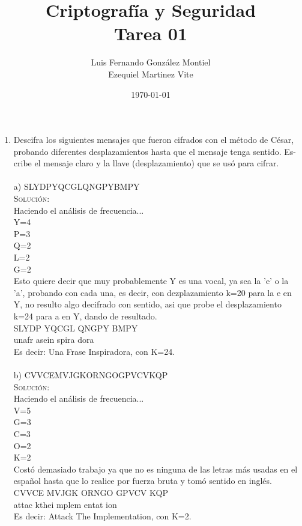 \documentclass[letterpaper,10pt]{article}
\title{Criptografía y Seguridad \\ Tarea 01}
\author{Luis Fernando González Montiel  \\
        Ezequiel Martinez Vite }
\date{\today}
\begin{document}
\maketitle

\begin{enumerate}
    \item Descifra los siguientes mensajes que fueron cifrados con el método de César, probando diferentes desplazamientos hasta que el mensaje tenga sentido. Es-
cribe el mensaje claro y la llave (desplazamiento) que se usó para cifrar.\\ \\
	a) SLYDPYQCGLQNGPYBMPY \\
    \textsc{Solución:}
    \\
    Haciendo el análisis de frecuencia...\\
Y=4\\
P=3\\
Q=2\\
L=2\\
G=2\\
Esto quiere decir que muy probablemente Y es una vocal, ya sea la 'e' o la 'a', probando con cada una, es decir, con dezplazamiento k=20 para la e en Y, no resulto algo decifrado con sentido, asi que probe el desplazamiento k=24 para a en Y, dando de resultado.\\
SLYDP YQCGL QNGPY BMPY\\
unafr asein spira dora\\
Es decir: Una Frase Inspiradora, con K=24.\\ \\

b) CVVCEMVJGKORNGOGPVCVKQP\\
\textsc{Solución:}
    \\
Haciendo el análisis de frecuencia...\\
V=5\\
G=3\\
C=3\\
O=2\\
K=2\\
Costó demasiado trabajo ya que no es ninguna de las letras más usadas en el español hasta que lo realice por fuerza bruta y tomó sentido en inglés.\\
CVVCE MVJGK ORNGO GPVCV KQP\\
attac kthei mplem entat ion\\
Es decir: Attack The Implementation, con K=2.\\ \\


\end{enumerate}
\end{document}
